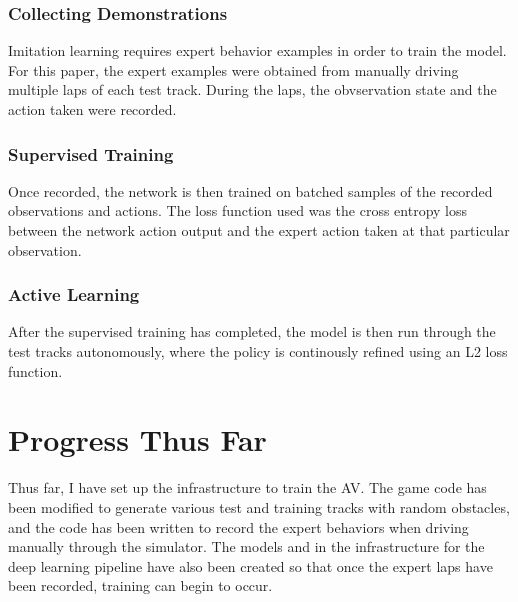 \documentclass[conference]{IEEEtran}
\begin{document}
\subsubsection{Collecting Demonstrations}
Imitation learning requires expert behavior examples in order to train the model. For this paper, 
the expert examples were obtained from manually driving multiple laps of each test track. During 
the laps, the obvservation state and the action taken were recorded.
\subsubsection{Supervised Training}
Once recorded, the network is then trained on batched samples of the recorded observations and actions.
The loss function used was the cross entropy loss between the network action output and the 
expert action taken at that particular observation. 
\subsubsection{Active Learning}
After the supervised training has completed, the model is then run through the test tracks autonomously,
where the policy is continously refined using an L2 loss function. 

\section{Progress Thus Far} 
\label{sec:conclusion}

Thus far, I have set up the infrastructure to train the AV. The game code has been modified to 
generate various test and training tracks with random obstacles, and the code has been written to 
record the expert behaviors when driving manually through the simulator. The models and in the infrastructure
for the deep learning pipeline have also been created so that once the expert laps have been recorded,
training can begin to occur. 




\end{document}
